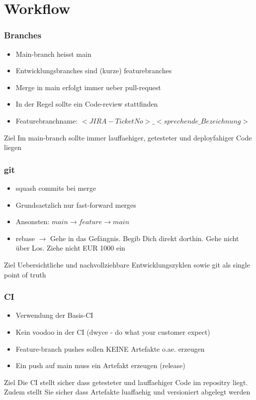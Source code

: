 \section{Workflow}
\begin{frame}
    \frametitle{Branches}
    \begin{itemize}
    \item Main-branch heisst main
    \item Entwicklungsbranches sind (kurze) featurebranches
    \item Merge in main erfolgt immer ueber pull-request
    \item In der Regel sollte ein Code-review stattfinden
    \item Featurebranchname: $<JIRA-TicketNo>\_<sprechende\_Bezeichnung>$
    \end{itemize}
    \begin{block}{Ziel}
      Im main-branch sollte immer lauffaehiger, getesteter und deployfahiger Code liegen
      \end{block}
  \end{frame}

\begin{frame}
    \frametitle{git}
    \begin{itemize}
    \item squash commits bei merge
    \item Grundsaetzlich nur fast-forward merges
    \item Ansonsten: $ main  \rightarrow feature \rightarrow main $
    \item rebase $\rightarrow$ Gehe in das Gefängnis. Begib Dich direkt dorthin. Gehe nicht über Los. Ziehe nicht EUR 1000 ein 
    \end{itemize}
    \begin{block}{Ziel}
      Uebersichtliche und nachvollziehbare Entwicklungszyklen sowie git als single point of truth
      \end{block}
\end{frame}

\begin{frame}
    \frametitle{CI}
    \begin{itemize}
      \item Verwendung der Basis-CI
      \item Kein voodoo in der CI (dwyce - do what your customer expect)
      \item Feature-branch pushes sollen KEINE Artefakte o.ae. erzeugen
      \item Ein push auf main muss ein Artefakt erzeugen (release)
    \end{itemize}
    \begin{block}{Ziel}
        Die CI stellt sicher dass getesteter und lauffaehiger Code im repositry liegt. Zudem stellt Sie sicher dass Artefakte luaffaehig und versioniert abgelegt werden
    \end{block}
\end{frame}


